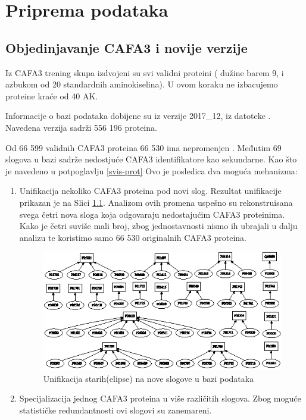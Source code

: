 
\chapter{Priprema podataka} %

\label{Priprema_podataka} %

\section{Objedinjavanje CAFA3 i novije \swissprot verzije}

Iz CAFA3 trening skupa izdvojeni su svi validni proteini ( dužine barem 9, i
azbukom od 20 standardnih aminokiselina). U ovom koraku ne izbacujemo proteine
kraće od 40 AK.

Informacije o \swissprot bazi podataka dobijene su iz verzije 2017\_12, iz datoteke
 \cite{sprot}.
Navedena verzija sadrži 556 196 proteina. 

Od 66 599 validnih CAFA3 proteina 66 530 ima nepromenjen . Međutim  69 slogova u \swissprot bazi sadrže nedostjuće CAFA3 identifikatore kao sekundarne.
Kao što je navedeno u potpoglavlju \ref{svis-prot} Ovo je posledica dva moguća mehanizma:

\begin{enumerate}
  \item Unifikacija nekoliko CAFA3 proteina pod novi slog.
    Rezultat unifikacije prikazan je na Slici \ref{fig:unifikacija_slogova}. Analizom
    ovih promena uspešno su rekonstruisana svega četri nova \swissprot sloga
    koja odgovaraju nedostajućim CAFA3 proteinima. Kako je četri
    suviše mali broj, zbog jednostavnosti nismo ih ubrajali u dalju analizu
    te koristimo samo 66 530 originalnih CAFA3 proteina.

  \begin{figure}[th]
  \centering
  \includegraphics[scale=2]{plots/unifikacija_slogova2.eps}
  \decoRule
  \caption{Unifikacija starih(elipse) na nove slogove u \swissprot bazi podataka}
  \label{fig:unifikacija_slogova}
  \end{figure}

  \item Specijalizacija jednog CAFA3 proteina u više različitih slogova.  Zbog moguće
    statističke redundantnosti ovi slogovi su zanemareni.
\end{enumerate}


